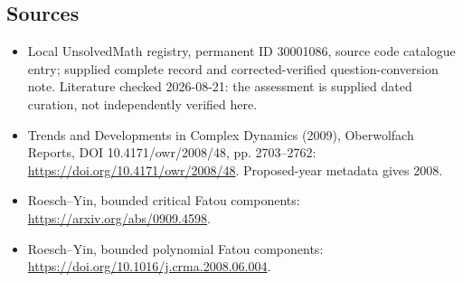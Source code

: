 \documentclass[11pt]{article}
\begin{document}
\subsection{Sources}
\begin{itemize}
\item Local UnsolvedMath registry, permanent ID 30001086, source code catalogue entry; supplied complete record and corrected-verified question-conversion note. Literature checked 2026-08-21: the assessment is supplied dated curation, not independently verified here.
\item Trends and Developments in Complex Dynamics (2009), Oberwolfach Reports, DOI 10.4171/owr/2008/48, pp. 2703--2762: \url{https://doi.org/10.4171/owr/2008/48}. Proposed-year metadata gives 2008.
\item Roesch--Yin, bounded critical Fatou components: \url{https://arxiv.org/abs/0909.4598}.
\item Roesch--Yin, bounded polynomial Fatou components: \url{https://doi.org/10.1016/j.crma.2008.06.004}.
\end{itemize}
\end{document}
